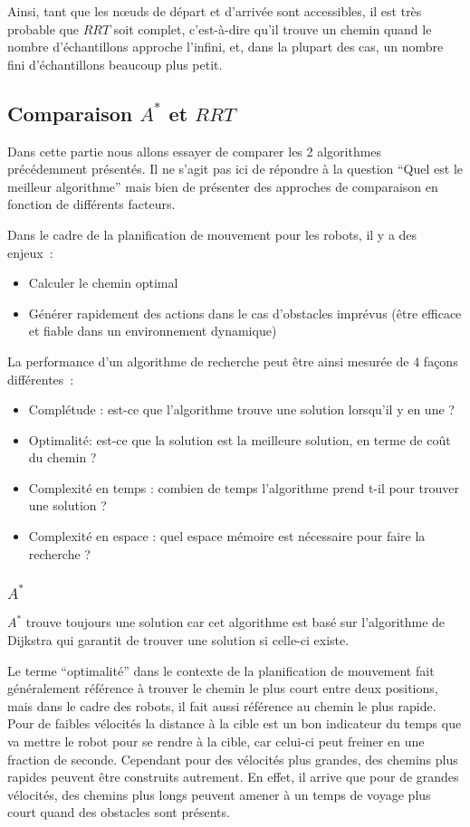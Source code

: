 \documentclass{article}
\begin{document}
Ainsi, tant que les nœuds de départ et d'arrivée sont accessibles, il est très probable que $RRT$ soit complet, c’est-à-dire qu’il trouve un chemin quand le nombre d'échantillons approche l'infini, et, dans la plupart des cas, un nombre fini d'échantillons beaucoup plus petit.

\subsection{Comparaison $A^*$ et $RRT$}
\label{comp}
Dans cette partie nous allons essayer de comparer les 2 algorithmes précédemment présentés. Il ne s'agit pas ici de répondre à la question “Quel est le meilleur algorithme” mais bien de présenter des approches de comparaison en fonction de différents facteurs.

Dans le cadre de la planification de mouvement pour les robots, il y a des enjeux~:
\begin{itemize}
  \item Calculer le chemin optimal 
  \item Générer rapidement des actions dans le cas d'obstacles imprévus (être efficace et fiable dans un environnement dynamique) 
\end{itemize}

La performance d'un algorithme de recherche peut être ainsi mesurée de 4 façons différentes~:
\begin{itemize}
  \item Complétude : est-ce que l'algorithme trouve une solution lorsqu'il y en une ?
  \item Optimalité: est-ce que la solution est la meilleure solution, en terme de coût du chemin ?
  \item Complexité en temps : combien de temps l'algorithme prend t-il pour trouver une solution ?
  \item Complexité en espace : quel espace mémoire est nécessaire pour faire la recherche ?
\end{itemize}

\subsubsection{$A^*$}
$A^*$ trouve toujours une solution car cet algorithme est basé sur l'algorithme de Dijkstra qui garantit de trouver une solution si celle-ci existe.

Le terme “optimalité” dans le contexte de la planification de mouvement fait généralement référence à trouver le chemin le plus court entre deux positions, mais dans le cadre des robots, il fait aussi référence au chemin le plus rapide. Pour de faibles vélocités la distance à la cible est un bon indicateur du temps que va mettre le robot pour se rendre à la cible, car celui-ci peut freiner en une fraction de seconde. Cependant pour des vélocités plus grandes, des chemins plus rapides peuvent être construits autrement. En effet, il arrive que pour de grandes vélocités, des chemins plus longs peuvent amener à un temps de voyage plus court quand des obstacles sont présents.
\end{document}
